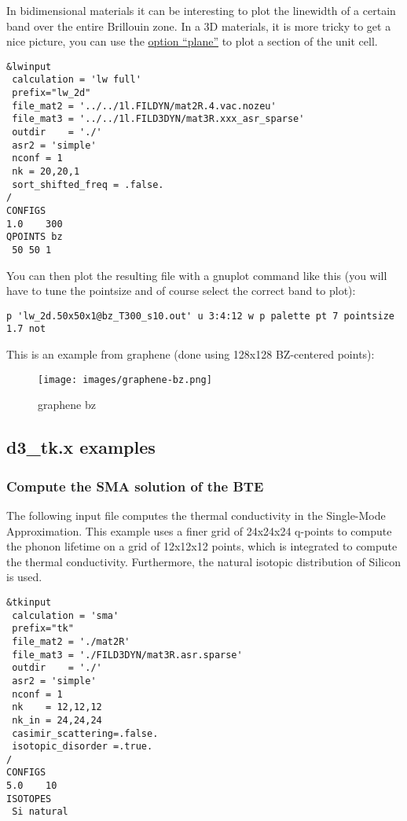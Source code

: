 \documentclass[
]{article}
\begin{document}
In bidimensional materials it can be interesting to plot the linewidth
of a certain band over the entire Brillouin zone. In a 3D materials, it
is more tricky to get a nice picture, you can use the
\protect\hyperlink{qpoints}{option \enquote{plane}} to plot a section of
the unit cell.

\begin{verbatim}
&lwinput 
 calculation = 'lw full' 
 prefix="lw_2d" 
 file_mat2 = '../../1l.FILDYN/mat2R.4.vac.nozeu' 
 file_mat3 = '../../1l.FILD3DYN/mat3R.xxx_asr_sparse' 
 outdir    = './' 
 asr2 = 'simple'
 nconf = 1 
 nk = 20,20,1 
 sort_shifted_freq = .false. 
/ 
CONFIGS 
1.0    300
QPOINTS bz 
 50 50 1
\end{verbatim}

You can then plot the resulting file with a gnuplot command like this
(you will have to tune the pointsize and of course select the correct
band to plot):

\begin{verbatim}
p 'lw_2d.50x50x1@bz_T300_s10.out' u 3:4:12 w p palette pt 7 pointsize 1.7 not
\end{verbatim}

This is an example from graphene (done using 128x128 BZ-centered
points):

\begin{figure}
\centering
\texttt{[image: images/graphene-bz.png]}
\caption{graphene bz}
\end{figure}

\hypertarget{d3_tk.x-examples}{%
\subsection{d3\_tk.x examples}\label{d3_tk.x-examples}}

\hypertarget{compute-the-sma-solution-of-the-bte}{%
\subsubsection{Compute the SMA solution of the
BTE}\label{compute-the-sma-solution-of-the-bte}}

The following input file computes the thermal conductivity in the
Single-Mode Approximation. This example uses a finer grid of 24x24x24
q-points to compute the phonon lifetime on a grid of 12x12x12 points,
which is integrated to compute the thermal conductivity. Furthermore,
the natural isotopic distribution of Silicon is used.

\begin{verbatim}
&tkinput 
 calculation = 'sma' 
 prefix="tk"
 file_mat2 = './mat2R' 
 file_mat3 = './FILD3DYN/mat3R.asr.sparse' 
 outdir    = './' 
 asr2 = 'simple' 
 nconf = 1
 nk    = 12,12,12
 nk_in = 24,24,24
 casimir_scattering=.false. 
 isotopic_disorder =.true.
/ 
CONFIGS 
5.0    10 
ISOTOPES 
 Si natural
\end{verbatim}
\end{document}
